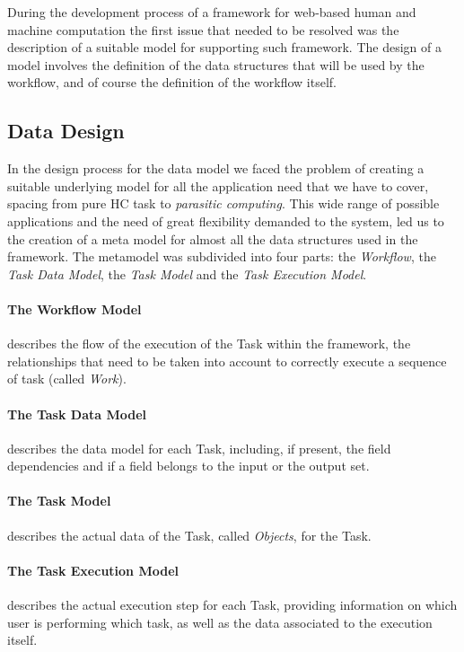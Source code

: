 
During the development process of a framework for web-based human and machine
computation the first issue that needed to be
resolved was the description of a suitable model for supporting such framework.
The design of a model involves the definition of the data structures that will
be used by the workflow, and of course the definition of the workflow itself.

\subsection{Data Design}
In the design process for the data model we faced the problem of creating a
suitable underlying model for all the application need that we have to cover,
spacing from pure \acl{HC} task to \emph{parasitic computing}. This wide range
of possible applications and the need of great flexibility demanded to the system,
led us to the creation of a meta model for almost all the data structures used in
the framework. The metamodel was subdivided into four parts: the \emph{Workflow}, the
\emph{Task Data Model}, the \emph{Task Model} and the \emph{Task Execution Model}.

\paragraph{The Workflow Model} describes the flow of the execution of the Task
within the framework, the relationships that need to be taken into account to
correctly execute a sequence of task (called \emph{Work}).

\paragraph{The Task Data Model} describes the data model for each Task, including,
if present, the field dependencies and if a field belongs to the input or the
output set.

\paragraph{The Task Model} describes the actual data of the Task, called
\emph{Objects}, for the Task.

\paragraph{The Task Execution Model} describes the actual execution step for
each Task, providing information on which user is performing which task, as well
as the data associated to the execution itself.



